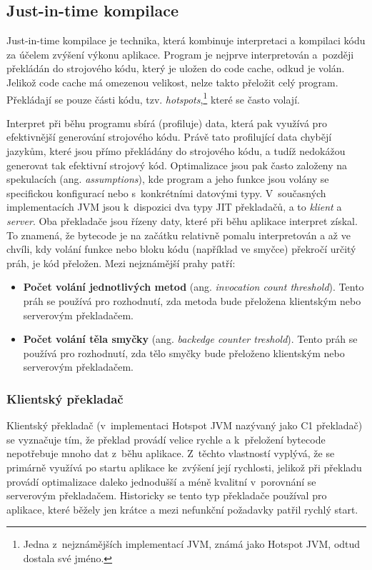 \documentclass[
  master,
  biblatex,
  figures=true,
  theorems,
  sourcecodes,
  glossaries,
  index
]{kidiplom}
\begin{document}
\subsection{Just-in-time kompilace}
\label{jit-compilation}
Just-in-time kompilace je technika, která kombinuje interpretaci a kompilaci kódu za účelem zvýšení výkonu aplikace. Program je nejprve interpretován a~později překládán do strojového kódu, který je uložen do code cache, odkud je volán. Jelikož code cache má omezenou velikost, nelze takto přeložit celý program. Překládají se pouze části kódu, tzv. \textit{hotspots},\footnote{Jedna z~nejznámějších implementací JVM, známá jako Hotspot JVM, odtud dostala své jméno.} které se často volají. 

Interpret při běhu programu sbírá (profiluje) data, která pak využívá pro efektivnější generování strojového kódu. Právě tato profilující data chybějí jazykům, které jsou přímo překládány do strojového kódu, a tudíž nedokážou generovat tak efektivní strojový kód. Optimalizace jsou pak často založeny na spekulacích (ang. \textit{assumptions}), kde program a jeho funkce jsou volány se specifickou konfigurací nebo s~konkrétními datovými typy. V~současných implementacích JVM jsou k~dispozici dva typy JIT překladačů, a to \textit{klient} a \textit{server}. Oba překladače jsou řízeny daty, které při běhu aplikace interpret získal. To znamená, že bytecode je na začátku relativně pomalu interpretován a až ve chvíli, kdy volání funkce nebo bloku kódu (například ve smyčce) překročí určitý práh, je kód přeložen. Mezi nejznámější prahy patří: 

\begin{itemize}
    \item \textbf{Počet volání jednotlivých metod} (ang. \textit{invocation count threshold}). Tento práh se používá pro rozhodnutí, zda metoda bude přeložena klientským nebo serverovým překladačem. 
    \item \textbf{Počet volání těla smyčky} (ang. \textit{backedge counter treshold}). Tento práh se používá pro rozhodnutí, zda tělo smyčky bude přeloženo klientským nebo serverovým překladačem.
\end{itemize}

\subsubsection{Klientský překladač}
Klientský překladač (v~implementaci Hotspot JVM nazývaný jako C1 překladač) se vyznačuje tím, že překlad provádí velice rychle a k~přeložení bytecode nepotřebuje mnoho dat z~běhu aplikace. Z~těchto vlastností vyplývá, že se primárně využívá po startu aplikace ke~zvýšení její rychlosti, jelikož při překladu provádí optimalizace daleko jednodušší a méně kvalitní v~porovnání se serverovým překladačem. Historicky se tento typ překladače používal pro aplikace, které běžely jen krátce a mezi nefunkční požadavky patřil rychlý start.
\end{document}
